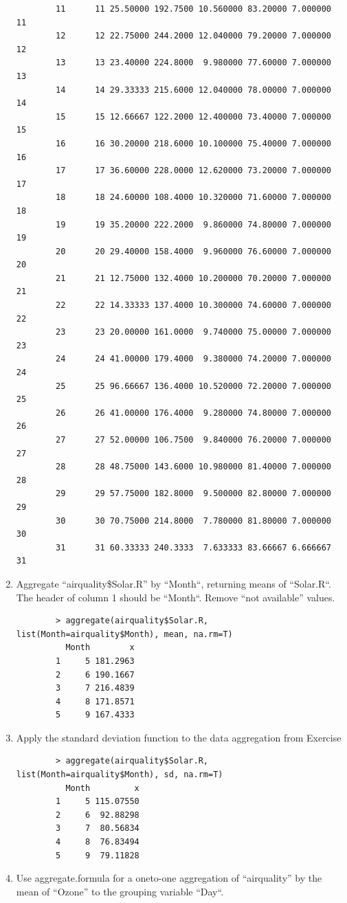 \documentclass[10pt]{article}
\begin{document}
\begin{enumerate}
\begin{verbatim}
        11      11 25.50000 192.7500 10.560000 83.20000 7.000000  11
        12      12 22.75000 244.2000 12.040000 79.20000 7.000000  12
        13      13 23.40000 224.8000  9.980000 77.60000 7.000000  13
        14      14 29.33333 215.6000 12.040000 78.00000 7.000000  14
        15      15 12.66667 122.2000 12.400000 73.40000 7.000000  15
        16      16 30.20000 218.6000 10.100000 75.40000 7.000000  16
        17      17 36.60000 228.0000 12.620000 73.20000 7.000000  17
        18      18 24.60000 108.4000 10.320000 71.60000 7.000000  18
        19      19 35.20000 222.2000  9.860000 74.80000 7.000000  19
        20      20 29.40000 158.4000  9.960000 76.60000 7.000000  20
        21      21 12.75000 132.4000 10.200000 70.20000 7.000000  21
        22      22 14.33333 137.4000 10.300000 74.60000 7.000000  22
        23      23 20.00000 161.0000  9.740000 75.00000 7.000000  23
        24      24 41.00000 179.4000  9.380000 74.20000 7.000000  24
        25      25 96.66667 136.4000 10.520000 72.20000 7.000000  25
        26      26 41.00000 176.4000  9.280000 74.80000 7.000000  26
        27      27 52.00000 106.7500  9.840000 76.20000 7.000000  27
        28      28 48.75000 143.6000 10.980000 81.40000 7.000000  28
        29      29 57.75000 182.8000  9.500000 82.80000 7.000000  29
        30      30 70.75000 214.8000  7.780000 81.80000 7.000000  30
        31      31 60.33333 240.3333  7.633333 83.66667 6.666667  31
        \end{verbatim}
    \item Aggregate “airquality\$Solar.R” by “Month“, returning means of “Solar.R“. The header of column 1 should be “Month“. Remove “not available” values.
        \begin{verbatim}
        > aggregate(airquality$Solar.R, list(Month=airquality$Month), mean, na.rm=T)
          Month        x
        1     5 181.2963
        2     6 190.1667
        3     7 216.4839
        4     8 171.8571
        5     9 167.4333
        \end{verbatim}
    \item Apply the standard deviation function to the data aggregation from Exercise
        \begin{verbatim}
        > aggregate(airquality$Solar.R, list(Month=airquality$Month), sd, na.rm=T)
          Month         x
        1     5 115.07550
        2     6  92.88298
        3     7  80.56834
        4     8  76.83494
        5     9  79.11828
        \end{verbatim}
    \item Use aggregate.formula for a oneto-one aggregation of “airquality” by the mean of “Ozone” to the grouping variable “Day“.

\end{enumerate}
\end{document}
